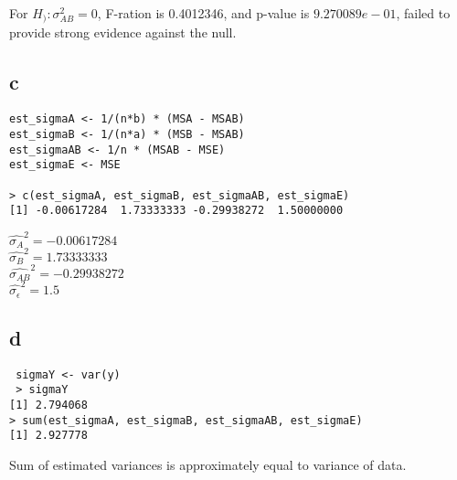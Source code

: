 \documentclass[11pt,letterpaper]{article}
\begin{document}
\noindent For $H_): \sigma_{AB}^2 = 0$, F-ration is 0.4012346, and p-value is $9.270089e-01$, failed to provide strong evidence against the null. 

\subsection*{c}
\begin{verbatim}
est_sigmaA <- 1/(n*b) * (MSA - MSAB)
est_sigmaB <- 1/(n*a) * (MSB - MSAB)
est_sigmaAB <- 1/n * (MSAB - MSE)
est_sigmaE <- MSE

> c(est_sigmaA, est_sigmaB, est_sigmaAB, est_sigmaE)
[1] -0.00617284  1.73333333 -0.29938272  1.50000000
\end{verbatim}

\noindent $\hat{\sigma_A}^2 = -0.00617284$ \\
$\hat{\sigma_B}^2 = 1.73333333$ \\
$\hat{\sigma_{AB}}^2 =-0.29938272$ \\
$\hat{\sigma_{\epsilon}}^2 =1.5$

\subsection*{d}
\begin{verbatim}
 sigmaY <- var(y)
 > sigmaY
[1] 2.794068
> sum(est_sigmaA, est_sigmaB, est_sigmaAB, est_sigmaE)
[1] 2.927778
\end{verbatim}

\noindent Sum of estimated variances is approximately equal to variance of data. 
\end{document}
